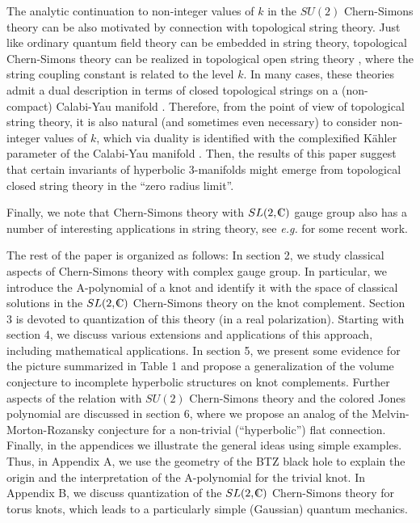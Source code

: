 The analytic continuation to non-integer values of $k$
in the $SU(2)$ Chern-Simons theory can be also motivated by
connection with topological string theory.
Just like ordinary quantum field theory can be embedded in
string theory, topological Chern-Simons theory can be
realized in topological open string theory \Wittencsstring,
where the string coupling constant is related to the level $k$.
In many cases, these theories admit a dual description
in terms of closed topological strings on a (non-compact)
Calabi-Yau manifold \GopakumarVafa.
Therefore, from the point of view of topological string theory,
it is also natural (and sometimes even necessary) to consider
non-integer values of $k$, which via duality is identified with
the complexified K\"ahler parameter of the Calabi-Yau manifold \GVonetwo.
Then, the results of this paper suggest that certain invariants
of hyperbolic 3-manifolds might emerge from topological closed
string theory in the ``zero radius limit''.

Finally, we note that Chern-Simons theory with $SL(2,\IC)$ gauge
group also has a number of interesting applications in string theory,
see {\it e.g.}  for some recent work.


The rest of the paper is organized as follows:
In section 2, we study classical aspects of Chern-Simons theory
with complex gauge group.
In particular, we introduce the A-polynomial of a knot and
identify it with the space of classical solutions in
the $SL(2,\IC)$ Chern-Simons theory on the knot complement.
Section 3 is devoted to quantization of this theory
(in a real polarization).
Starting with section 4, we discuss various extensions and
applications of this approach, including mathematical applications.
In section 5, we present some evidence for the picture
summarized in Table 1 and propose a generalization of the volume
conjecture to incomplete hyperbolic structures on knot complements.
Further aspects of the relation with $SU(2)$ Chern-Simons theory
and the colored Jones polynomial are discussed in section 6,
where we propose an analog of the Melvin-Morton-Rozansky conjecture
for a non-trivial (``hyperbolic'') flat connection.
Finally, in the appendices we illustrate the general ideas
using simple examples.
Thus, in Appendix A, we use the geometry of the BTZ black hole
to explain the origin and the interpretation of the A-polynomial
for the trivial knot.
In Appendix B, we discuss quantization of the $SL(2,\IC)$
Chern-Simons theory for torus knots, which leads to
a particularly simple (Gaussian) quantum mechanics.


